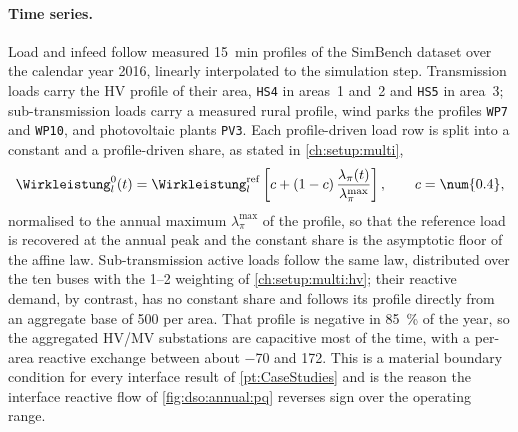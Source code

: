 \paragraph{Time series.}
Load and infeed follow measured \SI{15}{\minute} profiles of the SimBench dataset \cite{meinecke.2020} over the calendar year \num{2016}, linearly interpolated to the simulation step.
Transmission loads carry the \gls{HV} profile of their area, \texttt{HS4} in areas~1 and~2 and \texttt{HS5} in area~3; sub-transmission loads carry a measured rural profile, wind parks the profiles \texttt{WP7} and \texttt{WP10}, and photovoltaic plants \texttt{PV3}.
Each profile-driven load row is split into a constant and a profile-driven share, as stated in \cref{ch:setup:multi},
\begin{equation}
	\Wirkleistung_{l}^{0}(t) = \Wirkleistung_{l}^{\mathrm{ref}}\left[c + (1-c)\,\frac{\lambda_{\pi}(t)}{\lambda_{\pi}^{\max}}\right],
	\qquad c = \num{0.4},
	\label{eq:setup:profile_split}
\end{equation}
normalised to the annual maximum $\lambda_{\pi}^{\max}$ of the profile, so that the reference load is recovered at the annual peak and the constant share is the asymptotic floor of the affine law.
Sub-transmission active loads follow the same law, distributed over the ten buses with the \numrange{1}{2} weighting of \cref{ch:setup:multi:hv}; their reactive demand, by contrast, has no constant share and follows its profile directly from an aggregate base of \qty{500}{\MVar} per area.
That profile is negative in \SI{85}{\percent} of the year, so the aggregated \gls{HV}/\gls{MV} substations are capacitive most of the time, with a per-area reactive exchange between about \qty{-70}{\MVar} and \qty{+172}{\MVar}.
This is a material boundary condition for every interface result of \cref{pt:CaseStudies} and is the reason the interface reactive flow of \cref{fig:dso:annual:pq} reverses sign over the operating range.

